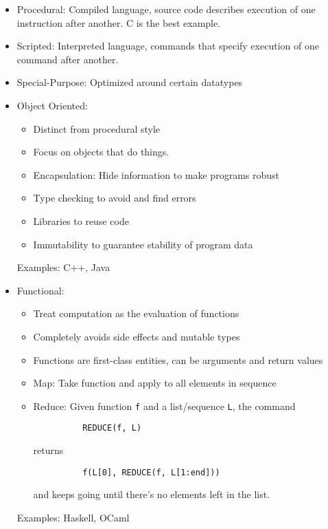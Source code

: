 \documentclass[12pt]{article}
\theoremstyle{plain}
\theoremstyle{definition}
\theoremstyle{remark}
\begin{document}
\begin{itemize}
  \item Procedural: Compiled language, source code describes execution
    of one instruction after another.
    C is the best example.
  \item Scripted:
    Interpreted language, commands that specify execution of one command
    after another.
  \item Special-Purpose:
    Optimized around certain datatypes
  \item Object Oriented:
    \begin{itemize}
      \item Distinct from procedural style
      \item Focus on objects that do things.
      \item Encapsulation:
        Hide information to make programs robust
      \item Type checking to avoid and find errors
      \item Libraries to reuse code
      \item Immutability to guarantee stability of program data
    \end{itemize}
    Examples: C++, Java
  \item Functional:
    \begin{itemize}
      \item Treat computation as the evaluation of functions
      \item Completely avoids side effects and mutable types
      \item Functions are first-class entities, can be arguments and return
        values
      \item Map: Take function and apply to all elements in sequence
      \item Reduce:
        Given function \texttt{f} and a list/sequence \texttt{L}, the
        command
        \begin{lstlisting}
          REDUCE(f, L)
        \end{lstlisting}
        returns
        \begin{lstlisting}
          f(L[0], REDUCE(f, L[1:end]))
        \end{lstlisting}
        and keeps going until there's no elements left in the list.

    \end{itemize}
    Examples: Haskell, OCaml
\end{itemize}
\end{document}
